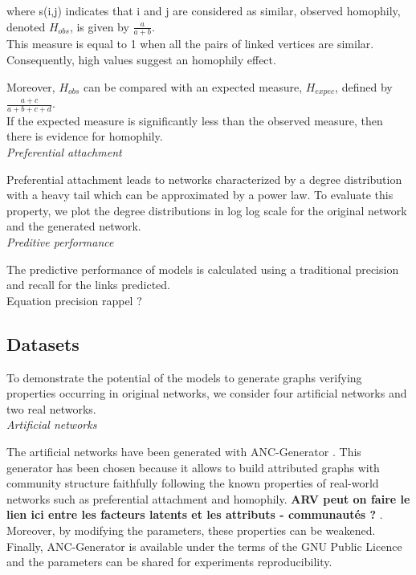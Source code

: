 where  s(i,j) indicates that i and j are considered as similar, observed homophily, denoted $H_{obs}$, is given by $\frac{a}{a+b}$.\\
This measure  is equal to 1 when all the pairs of linked vertices are similar. Consequently, high values suggest an homophily effect.

Moreover, $H_{obs}$ can be compared with an expected measure, $H_{expec}$, defined by  $ \frac{a+c}{a+b+c+d}$.\\

If the expected measure is significantly less than the observed measure, then there is evidence for homophily.\\

\textit{Preferential attachment}

Preferential attachment leads to networks characterized by a degree distribution with a heavy tail which can be approximated by a power law. To evaluate this property, we  plot the degree distributions in log log scale for the original network and the generated network.\\


\textit{Preditive performance}

The predictive performance of models is calculated using a traditional precision and recall for the links predicted.\\
Equation precision rappel ?

\subsection{Datasets}
To demonstrate the potential of the models to generate graphs verifying properties occurring in original networks, we consider four artificial networks and two real networks.\\

\textit{Artificial networks}

The artificial networks have been generated with ANC-Generator \cite{largeron2015}. This generator has been chosen because it allows to build attributed graphs with community structure faithfully following the known properties of real-world networks such as preferential attachment and homophily. 
\textbf{ ARV peut on faire le lien ici entre les facteurs latents et les attributs - communautés ? }.
Moreover, by modifying the parameters, these properties can be weakened. Finally, ANC-Generator is available under the terms of the GNU Public Licence and the parameters can be shared for experiments reproducibility. 

